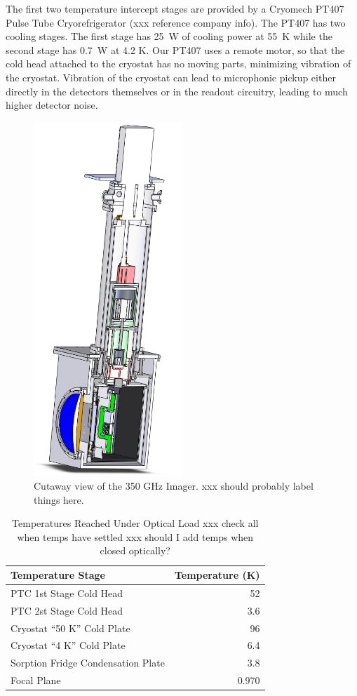 \documentclass[10pt,twocolumn,article]{memoir}
\begin{document}
The first two temperature intercept stages are provided by a Cryomech PT407 Pulse Tube Cryorefrigerator (xxx reference company info).
The PT407 has two cooling stages.
The first stage has 25~W of cooling power at 55~K while the second stage has 0.7~W at 4.2 K.
Our PT407 uses a remote motor, so that the cold head attached to the cryostat has no moving parts, minimizing vibration of the cryostat.
Vibration of the cryostat can lead to microphonic pickup either directly in the detectors themselves or in the readout circuitry, leading to much higher detector noise.

\begin{figure}[th]
\centering
\includegraphics[width=0.5\textwidth]{images/cryostat-cutaway.png}
\caption{Cutaway view of the 350 GHz Imager. xxx should probably label things here.}
\label{fig:cryo-cutaway}
\end{figure}

\begin{table}[ht]
\centering
\caption{Temperatures Reached Under Optical Load xxx check all when temps have settled xxx should I add temps when closed optically?}
\label{tab:temp-optical-load}
\begin{tabular}{l r}
\toprule
Temperature Stage &  Temperature (K)\\
\midrule
PTC 1st Stage Cold Head 			& 52 \\
PTC 2st Stage Cold Head 			& 3.6 \\
Cryostat ``50 K'' Cold Plate 		& 96 \\
Cryostat ``4 K'' Cold Plate 			& 6.4 \\
Sorption Fridge Condensation Plate 	& 3.8 \\
Focal Plane 						& 0.970 \\
\bottomrule
\end{tabular}
\end{table}
\end{document}
